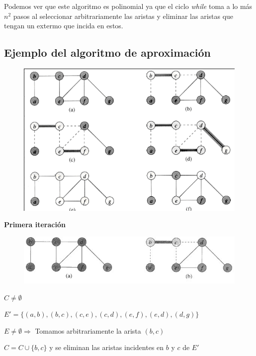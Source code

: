 \documentclass[letterpaper,12pt]{article}
\begin{document}
Podemos ver que este algoritmo es polinomial ya que el ciclo \textit{while} toma
a lo más $n^2$ pasos al seleccionar arbitrariamente las aristas y eliminar las
aristas que tengan un extermo que incida en estos.

\subsection{Ejemplo del algoritmo de aproximación}

\begin{figure}[tph!]
    \centerline{\includegraphics[totalheight=8cm]{img/vc.png}}
\end{figure}

\newpage

\textbf{Primera iteración}

\begin{figure}[tph!]
    \centerline{\includegraphics[totalheight=3cm]{img/vc1.jpg}}
\end{figure}

$C \neq \emptyset$

$E'= \{ (a,b), (b,c), (c,e), (c,d), (e,f), (e,d), (d,g) \}$

$E \neq \emptyset \Rightarrow$ Tomamos arbitrariamente la arista $(b,c)$

$C = C \cup \{b,c\}$ y se eliminan las aristas incidentes en $b$ y $c$ de $E'$
\end{document}
